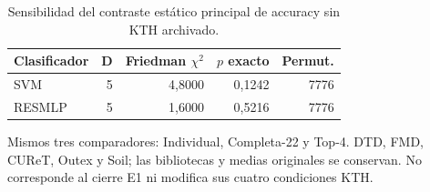 \begin{table}[!htbp]\centering
\fontsize{8}{10}\selectfont\setlength{\tabcolsep}{4pt}
\caption{Sensibilidad del contraste estático principal de accuracy sin KTH archivado.}\label{tab:ars-static-no-kth}
\begin{tabular}{@{}lrrrr@{}}\toprule
Clasificador & D & Friedman $\chi^2$ & $p$ exacto & Permut.\\\midrule
SVM & 5 & 4,8000 & 0,1242 & 7776\\
RESMLP & 5 & 1,6000 & 0,5216 & 7776\\
\bottomrule\end{tabular}
\par\smallskip\begin{minipage}{0.98\textwidth}\footnotesize Mismos tres comparadores: Individual, Completa-22 y Top-4. DTD, FMD, CUReT, Outex y Soil; las bibliotecas y medias originales se conservan. No corresponde al cierre E1 ni modifica sus cuatro condiciones KTH.\end{minipage}
\end{table}
